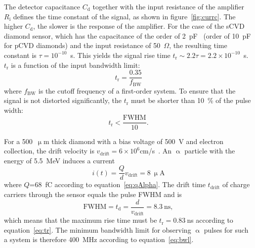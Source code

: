 The detector capacitance $C_\mathrm{d}$ together with the input resistance of the amplifier $R_\mathrm{i}$ defines the time constant of the signal, as shown in figure~\ref{fig:currc}. The higher $C_\mathrm{d}$, the slower is the response of the amplifier. For the case of the sCVD diamond sensor, which has the capacitance of the order of 2~pF~\cite{IIa:00001} (order of 10~pF for pCVD diamonds) and the input resistance of 50~$\Omega$, the resulting time constant is $\tau=10^{-10}$~s. This yields the signal rise time $t_\mathrm{r}\sim2.2\tau=2.2\times10^{-10}$~s. $t_\mathrm{r}$ is a function of the input bandwidth limit:
\begin{equation}
\label{eq:bwl}
t_\mathrm{r}=\frac{0.35}{f_\mathrm{BW}}
\end{equation}
where $f_\mathrm{BW}$ is the cutoff frequency of a first-order system. To ensure that the signal is not distorted significantly, the $t_\mathrm{r}$ must be shorter than 10~\% of the pulse width:
\begin{equation}
\label{eq:tr}
t_\mathrm{r} < \frac{\mathrm{FWHM}}{10}.
\end{equation}

For a 500~$\upmu$m thick diamond with a bias voltage of 500~V and electron collection, the drift velocity is $v_\mathrm{drift}=6\times10^6$cm/s~\cite{Jansen:1956431}. An $\upalpha$ particle with the energy of 5.5~MeV induces a current
\begin{equation}
i(t)=\frac{Q}{d}v_\mathrm{drift} = 8~\mathrm{\upmu A}
\end{equation}
where $Q$=68~fC according to equation~\ref{eq:qAlpha}. The drift time $t_\mathrm{drift}$ of charge carriers through the sensor equals the pulse FWHM and is 
\begin{equation}
\mathrm{FWHM} = t_\mathrm{d}=\frac{d}{v_\mathrm{drift}} = 8.3~\mathrm{ns},
\end{equation}
which means that the maximum rise time must be $t_\mathrm{r}=0.83~$ns according to equation~\ref{eq:tr}. The minimum bandwidth limit for observing $\upalpha$ pulses for such a system is therefore 400~MHz according to equation~\ref{eq:bwl}. 


